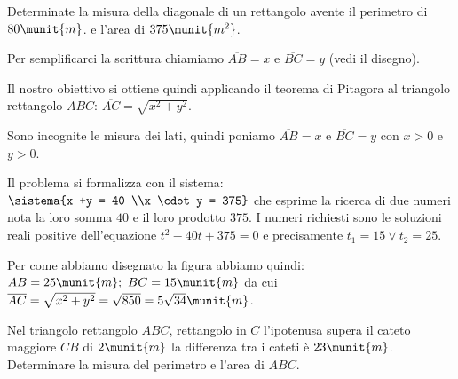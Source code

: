 \begin{problema}{}{}
Determinate la misura della diagonale di un rettangolo avente il 
perimetro di 
\(80\munit{m}\). e l'area di \(375\munit{m^2}\).

\end{problema}

\begin{soluzione}
Per semplificarci la scrittura chiamiamo \(\overline {AB} = x\) e 
\(\overline {BC} = y\) (vedi il disegno).

Il nostro obiettivo si ottiene quindi applicando il teorema di Pitagora 
al triangolo rettangolo \(ABC\): 
\(\overline {AC} = \sqrt{x^{2} +y^{2}}\).

Sono incognite le misura dei lati, quindi poniamo \(\overline {AB} = x\) e 
\(\overline {BC} = y \) con \(x > 0\) e \(y > 0\).

Il problema si formalizza con il sistema:
\(\sistema{x +y = 40 \\x \cdot y = 375}\)
che esprime la ricerca di due numeri nota la loro somma \(40\) e il loro 
prodotto \(375\). 
I numeri richiesti sono le soluzioni reali positive dell'equazione 
\(t^{2} -40 t +375 = 0\) e precisamente \(t_{1} = 15 \vee t_{2} = 25\).

Per come abbiamo disegnato la figura abbiamo quindi: 
\(AB = 25\munit{m};~BC = 15\munit{m}\) da cui 
\(\overline {AC} = \sqrt{x^{2} +y^{2}} =
\sqrt{850} = 5 \sqrt{34}\munit{m}\).
\end{soluzione}

\begin{problema}{}{}
Nel triangolo rettangolo \(ABC\), rettangolo in \(C\) l'ipotenusa supera il 
cateto maggiore \(CB\) di \(2\munit{m}\) la differenza tra i cateti è 
\(23\munit{m}\). 
Determinare la misura del perimetro e l'area di \(ABC\).
\end{problema}


